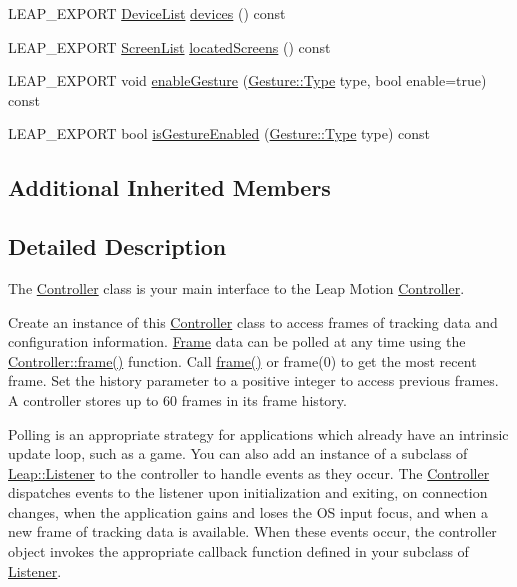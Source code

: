 \begin{DoxyCompactItemize}
\item 
L\+E\+A\+P\+\_\+\+E\+X\+P\+O\+R\+T \hyperlink{class_leap_1_1_device_list}{Device\+List} \hyperlink{class_leap_1_1_controller_a5dc199cb8f41cf07724c494107744251}{devices} () const 
\item 
L\+E\+A\+P\+\_\+\+E\+X\+P\+O\+R\+T \hyperlink{class_leap_1_1_screen_list}{Screen\+List} \hyperlink{class_leap_1_1_controller_ab6cf5b48ef434b3d58cf8962451f4df3}{located\+Screens} () const 
\item 
L\+E\+A\+P\+\_\+\+E\+X\+P\+O\+R\+T void \hyperlink{class_leap_1_1_controller_ad24410dee9de51b16ceb6b8c97fe5a36}{enable\+Gesture} (\hyperlink{class_leap_1_1_gesture_a6fa6dd4f28c502f0d55abc6b71c6f9b1}{Gesture\+::\+Type} type, bool enable=true) const 
\item 
L\+E\+A\+P\+\_\+\+E\+X\+P\+O\+R\+T bool \hyperlink{class_leap_1_1_controller_a8b3f3853d8cf1f805542006182c99729}{is\+Gesture\+Enabled} (\hyperlink{class_leap_1_1_gesture_a6fa6dd4f28c502f0d55abc6b71c6f9b1}{Gesture\+::\+Type} type) const 
\end{DoxyCompactItemize}
\subsection*{Additional Inherited Members}


\subsection{Detailed Description}
The \hyperlink{class_leap_1_1_controller}{Controller} class is your main interface to the Leap Motion \hyperlink{class_leap_1_1_controller}{Controller}.

Create an instance of this \hyperlink{class_leap_1_1_controller}{Controller} class to access frames of tracking data and configuration information. \hyperlink{class_leap_1_1_frame}{Frame} data can be polled at any time using the \hyperlink{class_leap_1_1_controller_a5796b988806ea9fd94e2d987e0e24b32}{Controller\+::frame()} function. Call \hyperlink{class_leap_1_1_controller_a5796b988806ea9fd94e2d987e0e24b32}{frame()} or frame(0) to get the most recent frame. Set the history parameter to a positive integer to access previous frames. A controller stores up to 60 frames in its frame history.

Polling is an appropriate strategy for applications which already have an intrinsic update loop, such as a game. You can also add an instance of a subclass of \hyperlink{class_leap_1_1_listener}{Leap\+::\+Listener} to the controller to handle events as they occur. The \hyperlink{class_leap_1_1_controller}{Controller} dispatches events to the listener upon initialization and exiting, on connection changes, when the application gains and loses the O\+S input focus, and when a new frame of tracking data is available. When these events occur, the controller object invokes the appropriate callback function defined in your subclass of \hyperlink{class_leap_1_1_listener}{Listener}.

